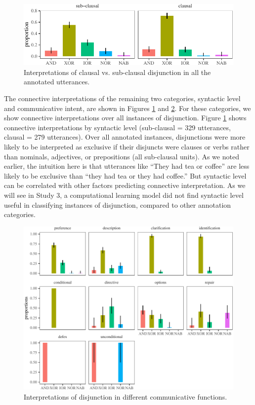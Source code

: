 \documentclass[
  english,
  ,man,floatsintext]{apa6}
\begin{document}
\begin{figure}[H]

{\centering \includegraphics{figs/syntaxPlot-1} 

}

\caption{Interpretations of clausal vs. sub-clausal disjunction in all the annotated utterances.}\label{fig:syntaxPlot}
\end{figure}

The connective interpretations of the remaining two categories, syntactic level and communicative intent, are shown in Figures \ref{fig:syntaxPlot} and \ref{fig:speechActPlot}. For these categories, we show connective interpretations over all instances of disjunction. Figure \ref{fig:syntaxPlot} shows connective interpretations by syntactic level (sub-clausal = 329 utterances, clausal = 279 utterances). Over all annotated instances, disjunctions were more likely to be interpreted as exclusive if their disjuncts were clauses or verbs rather than nominals, adjectives, or prepositions (all sub-clausal units). As we noted earlier, the intuition here is that utterances like ``They had tea or coffee'' are less likely to be exclusive than ``they had tea or they had coffee.'' But syntactic level can be correlated with other factors predicting connective interpretation. As we will see in Study 3, a computational learning model did not find syntactic level useful in classifying instances of disjunction, compared to other annotation categories.

\begin{figure}[H]

{\centering \includegraphics{figs/speechActPlot-1} 

}

\caption{Interpretations of disjunction in different communicative functions.}\label{fig:speechActPlot}
\end{figure}
\end{document}
